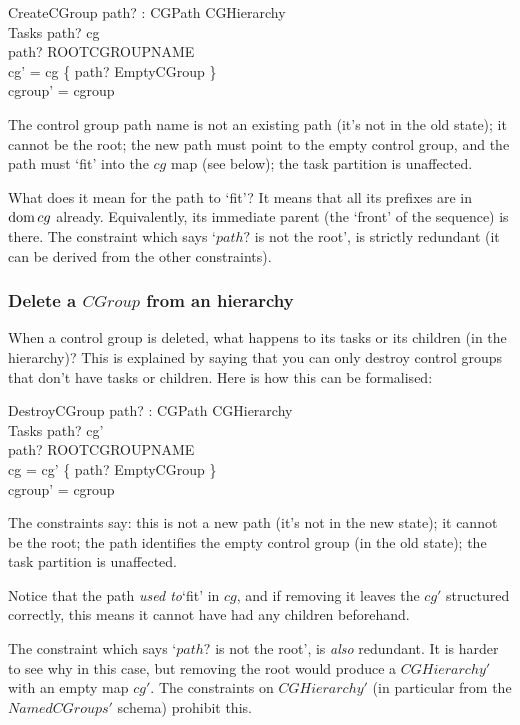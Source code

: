\documentclass[a4paper,twoside,12pt]{article}
\begin{document}
\begin{schema}{CreateCGroup}
path? : CGPath
\also
\Delta CGHierarchy \\
\Xi Tasks
\where
path? \notin \dom cg \\
path? \neq ROOTCGROUPNAME \\
cg' = cg \cup \{ path? \mapsto EmptyCGroup \} \\
cgroup' = cgroup
\end{schema}
The control group path name is not an existing path (it's not in the old state); it cannot be the root; the new path must point to the empty control group, and the path must `fit' into the $cg$ map (see below); the task partition is unaffected.

What does it mean for the path to `fit'? It means that all its prefixes are in $\mathop{\mathrm{dom}} cg$ already. Equivalently, its immediate parent (the `front' of the sequence) is there.
The constraint which says `$path?$ is not the root', is strictly redundant (it can be derived from the other constraints).

\subsubsection{Delete a $CGroup$ from an hierarchy}

When a control group is deleted, what happens to its tasks or its children (in the hierarchy)?
This is explained by saying that you can only destroy control groups that don't have tasks or children.
Here is how this can be formalised:

\begin{schema}{DestroyCGroup}
path? : CGPath
\also
\Delta CGHierarchy \\
\Xi Tasks
\where
path? \notin \dom cg' \\
path? \neq ROOTCGROUPNAME \\
cg = cg' \cup \{ path? \mapsto EmptyCGroup \} \\
cgroup' = cgroup
\end{schema}
The constraints say: this is not a new path (it's not in the new state); it cannot be the root; 
the path identifies the empty control group (in the old state); the task partition is unaffected.

Notice that the path \emph{used to}`fit' in $cg$, and if removing it leaves the $cg'$ structured correctly, 
this means it cannot have had any children beforehand.

The constraint which says `$path?$ is not the root', is \emph{also} redundant. 
It is harder to see why in this case, but removing the root would produce a $CGHierarchy'$ with an empty map $cg'$. 
The constraints on $CGHierarchy'$ (in particular from the $NamedCGroups'$ schema) prohibit this.
\end{document}
